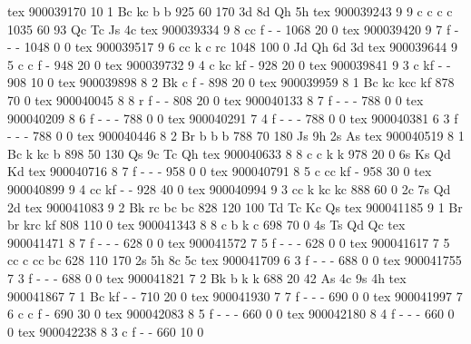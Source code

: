 tex       900039170 10  1 Bc  kc    b     b          925   60  170 3d 8d Qh 5h
tex       900039243  9  9 c   c     c     c         1035   60   93 Qc Tc Js 4c
tex       900039334  9  8 cc  f     -     -         1068   20    0 
tex       900039420  9  7 f   -     -     -         1048    0    0 
tex       900039517  9  6 cc  k     c     rc        1048  100    0 Jd Qh 6d 3d
tex       900039644  9  5 c   c     f     -          948   20    0 
tex       900039732  9  4 c   kc    kf    -          928   20    0 
tex       900039841  9  3 c   kf    -     -          908   10    0 
tex       900039898  8  2 Bk  c     f     -          898   20    0 
tex       900039959  8  1 Bc  kc    kcc   kf         878   70    0 
tex       900040045  8  8 r   f     -     -          808   20    0 
tex       900040133  8  7 f   -     -     -          788    0    0 
tex       900040209  8  6 f   -     -     -          788    0    0 
tex       900040291  7  4 f   -     -     -          788    0    0 
tex       900040381  6  3 f   -     -     -          788    0    0 
tex       900040446  8  2 Br  b     b     b          788   70  180 Js 9h 2s As
tex       900040519  8  1 Bc  k     kc    b          898   50  130 Qs 9c Tc Qh
tex       900040633  8  8 c   c     k     k          978   20    0 6s Ks Qd Kd
tex       900040716  8  7 f   -     -     -          958    0    0 
tex       900040791  8  5 c   cc    kf    -          958   30    0 
tex       900040899  9  4 cc  kf    -     -          928   40    0 
tex       900040994  9  3 cc  k     kc    kc         888   60    0 2c 7s Qd 2d
tex       900041083  9  2 Bk  rc    bc    bc         828  120  100 Td Tc Kc Qs
tex       900041185  9  1 Br  br    krc   kf         808  110    0 
tex       900041343  8  8 c   b     k     c          698   70    0 4s Ts Qd Qc
tex       900041471  8  7 f   -     -     -          628    0    0 
tex       900041572  7  5 f   -     -     -          628    0    0 
tex       900041617  7  5 cc  c     cc    bc         628  110  170 2s 5h 8c 5c
tex       900041709  6  3 f   -     -     -          688    0    0 
tex       900041755  7  3 f   -     -     -          688    0    0 
tex       900041821  7  2 Bk  b     k     k          688   20   42 As 4c 9s 4h
tex       900041867  7  1 Bc  kf    -     -          710   20    0 
tex       900041930  7  7 f   -     -     -          690    0    0 
tex       900041997  7  6 c   c     f     -          690   30    0 
tex       900042083  8  5 f   -     -     -          660    0    0 
tex       900042180  8  4 f   -     -     -          660    0    0 
tex       900042238  8  3 c   f     -     -          660   10    0 
